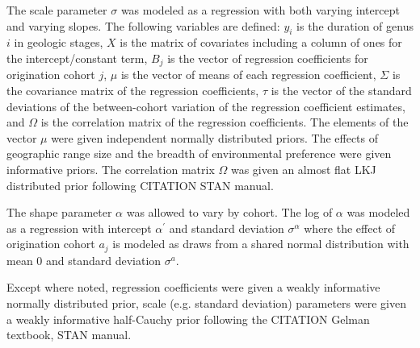 \documentclass{article}
\begin{document}
The scale parameter \(\sigma\) was modeled as a regression with both varying intercept and varying slopes. The following variables are defined: \(y_{i}\) is the duration of genus \(i\) in geologic stages, \(X\) is the matrix of covariates including a column of ones for the intercept/constant term, \(B_{j}\) is the vector of regression coefficients for origination cohort \(j\), \(\mu\) is the vector of means of each regression coefficient, \(\Sigma\) is the covariance matrix of the regression coefficients, \(\tau\) is the vector of the standard deviations of the between-cohort variation of the regression coefficient estimates, and \(\Omega\) is the correlation matrix of the regression coefficients. The elements of the vector \(\mu\) were given independent normally distributed priors. The effects of geographic range size and the breadth of environmental preference were given informative priors. The correlation matrix \(\Omega\) was given an almost flat LKJ distributed prior following CITATION STAN manual.

The shape parameter \(\alpha\) was allowed to vary by cohort. The log of \(\alpha\) was modeled as a regression with intercept \(\alpha^{\prime}\) and standard deviation \(\sigma^{\alpha}\) where the effect of origination cohort \(a_{j}\) is modeled as draws from a shared normal distribution with mean 0 and standard deviation \(\sigma^{a}\). 

Except where noted, regression coefficients were given a weakly informative normally distributed prior, scale (e.g. standard deviation) parameters were given a weakly informative half-Cauchy prior following the CITATION Gelman textbook, STAN manual. 
\end{document}
